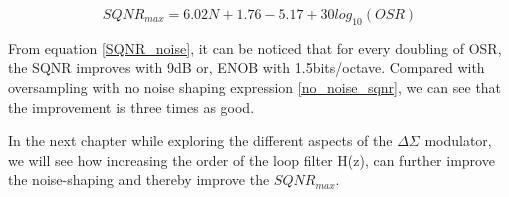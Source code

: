 \begin{equation}\label{SQNR_noise}
  SQNR_{max} = 6.02N + 1.76 - 5.17 + 30log_{10}(OSR)  
\end{equation}

From equation \ref{SQNR_noise}, it can be noticed that for every doubling of OSR, the SQNR improves with 9dB or, ENOB with 1.5bits/octave. Compared with oversampling with no noise shaping expression \ref{no_noise_sqnr}, we can see that the improvement is three times as good. 

In the next chapter while exploring the different aspects of the $\Delta\Sigma$ modulator, we will see how increasing the order of the loop filter H(z), can further improve the noise-shaping and thereby improve the $SQNR_{max}$. 
